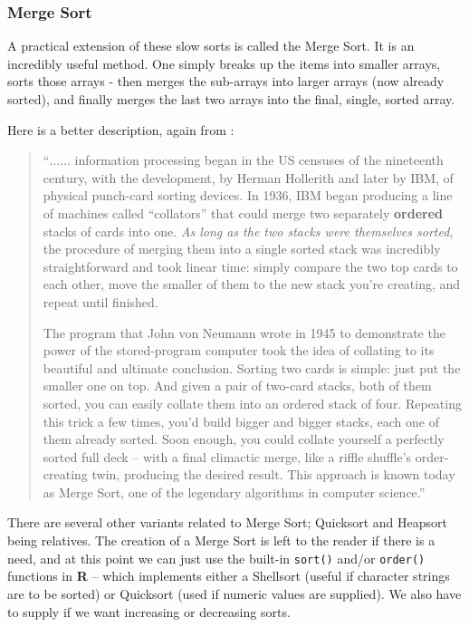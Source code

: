 \subsubsection{Merge Sort}
A practical extension of these slow sorts is called the Merge Sort.  It is an incredibly useful method.  One simply breaks up the items into smaller arrays, sorts those arrays - then merges the sub-arrays into larger arrays (now already sorted), and finally merges the last two arrays into the final, single, sorted array.

Here is a better description, again from \cite{Christian2016}:
\begin{quote}
``$\dots \dots$ information processing began in the US censuses of the nineteenth century, with the development, by Herman Hollerith and later by IBM, of physical punch-card sorting devices. In 1936, IBM began producing a line of machines called ``collators'' that could merge two separately \textbf{ordered} stacks of cards into one. \textit{As long as the two stacks were themselves sorted}, the procedure of merging them into a single sorted stack was incredibly straightforward and took linear time: simply compare the two top cards to each other, move the smaller of them to the new stack you're creating, and repeat until finished.

The program that John von Neumann wrote in 1945 to demonstrate the power of the stored-program computer took the idea of collating to its beautiful and ultimate conclusion. Sorting two cards is simple: just put the smaller one on top. And given a pair of two-card stacks, both of them sorted, you can easily collate them into an ordered stack of four. Repeating this trick a few times, you'd build bigger and bigger stacks, each one of them already sorted. Soon enough, you could collate yourself a perfectly sorted full deck -- with a final climactic merge, like a riffle shuffle's order-creating twin, producing the desired result. This approach is known today as Merge Sort, one of the legendary algorithms in computer science.''
\end{quote}

There are several other variants related to Merge Sort; Quicksort and Heapsort being relatives.  The creation of a Merge Sort is left to the reader if there is a need, and at this point we can just use the built-in \texttt{sort()}  and/or \texttt{order()} functions in \textbf{R} -- which implements either a Shellsort (useful if character strings are to be sorted) or Quicksort (used if numeric values are supplied).   We also have to supply if we want increasing or decreasing sorts.

